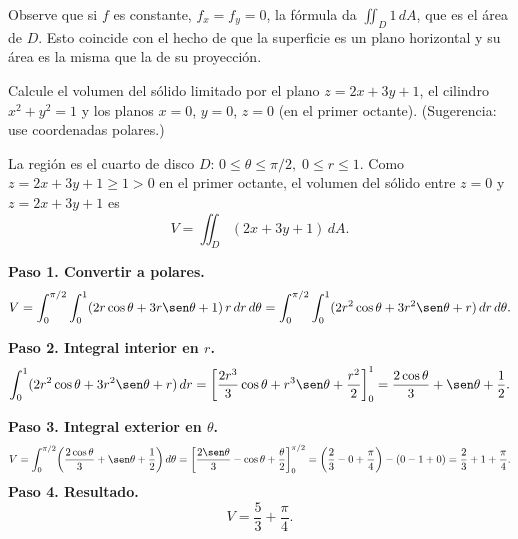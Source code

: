 \begin{rem}
Observe que si \(f\) es constante, \(f_x=f_y=0\), la fórmula da \(\iint_D 1\,dA\), que es el área de \(D\). Esto coincide con el hecho de que la superficie es un plano horizontal y su área es la misma que la de su proyección.
\end{rem}

\begin{prob}[Volumen]
Calcule el volumen del sólido limitado por el plano \(z=2x+3y+1\), el cilindro \(x^2+y^2=1\) y los planos \(x=0\), \(y=0\), \(z=0\) (en el primer octante). (Sugerencia: use coordenadas polares.)
\begin{myproof}
La región es el cuarto de disco $D:\,0\le\theta\le\pi/2,\;0\le r\le1$. Como $z=2x+3y+1\ge1>0$ en el primer octante, el volumen del sólido entre $z=0$ y $z=2x+3y+1$ es
\[
V=\iint_D(2x+3y+1)\,dA.
\]

\textbf{Paso 1. Convertir a polares.}
\[
V=\int_0^{\pi/2}\int_0^1(2r\cos\theta+3r\sen\theta+1)\,r\,dr\,d\theta
=\int_0^{\pi/2}\int_0^1(2r^2\cos\theta+3r^2\sen\theta+r)\,dr\,d\theta.
\]

\textbf{Paso 2. Integral interior en $r$.}
\[
\int_0^1(2r^2\cos\theta+3r^2\sen\theta+r)\,dr
=\left[\frac{2r^3}{3}\cos\theta+r^3\sen\theta+\frac{r^2}{2}\right]_0^1
=\frac{2\cos\theta}{3}+\sen\theta+\frac{1}{2}.
\]

\textbf{Paso 3. Integral exterior en $\theta$.}
\[
V=\int_0^{\pi/2}\!\left(\frac{2\cos\theta}{3}+\sen\theta+\frac{1}{2}\right)d\theta
=\left[\frac{2\sen\theta}{3}-\cos\theta+\frac{\theta}{2}\right]_0^{\pi/2}
=\left(\frac{2}{3}-0+\frac{\pi}{4}\right)-(0-1+0)
=\frac{2}{3}+1+\frac{\pi}{4}.
\]
\textbf{Paso 4. Resultado.}
\[
\boxed{V=\frac{5}{3}+\frac{\pi}{4}.}
\]
\end{myproof}
\end{prob}

